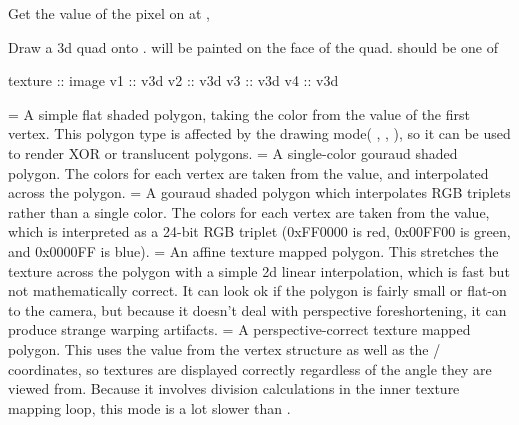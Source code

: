 
Get the value of the pixel on  at , 




Draw a 3d quad onto .  will be painted on the face of the quad.  should be one of

\begin{schemedisplay}
texture :: image
v1 :: v3d
v2 :: v3d
v3 :: v3d
v4 :: v3d
\end{schemedisplay}

 =  A simple flat shaded polygon, taking the color from the  value of the first vertex. This polygon type is affected by the drawing mode( , ,  ), so it can be used to render XOR or translucent polygons.\newline
{} = A single-color gouraud shaded polygon. The colors for each vertex are taken from the  value, and interpolated across the polygon.\newline
{} = A gouraud shaded polygon which interpolates RGB triplets rather than a single color. The colors for each vertex are taken from the  value, which is interpreted as a 24-bit RGB triplet (0xFF0000 is red, 0x00FF00 is green, and 0x0000FF is blue).\newline
{} = An affine texture mapped polygon. This stretches the texture across the polygon with a simple 2d linear interpolation, which is fast but not mathematically correct. It can look ok if the polygon is fairly small or flat-on to the camera, but because it doesn't deal with perspective foreshortening, it can produce strange warping artifacts.\newline
{} = A perspective-correct texture mapped polygon. This uses the  value from the vertex structure as well as the / coordinates, so textures are displayed correctly regardless of the angle they are viewed from. Because it involves division calculations in the inner texture mapping loop, this mode is a lot slower than .\newline
